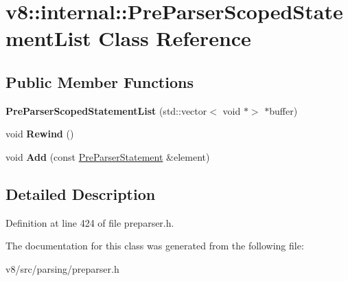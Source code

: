 \hypertarget{classv8_1_1internal_1_1PreParserScopedStatementList}{}\section{v8\+:\+:internal\+:\+:Pre\+Parser\+Scoped\+Statement\+List Class Reference}
\label{classv8_1_1internal_1_1PreParserScopedStatementList}
\subsection*{Public Member Functions}
\begin{DoxyCompactItemize}
\item 
\mbox{\label{classv8_1_1internal_1_1PreParserScopedStatementList_aec07c7d0be65465f50ce0a802b4750d4}} 
{\bfseries Pre\+Parser\+Scoped\+Statement\+List} (std\+::vector$<$ void $\ast$$>$ $\ast$buffer)
\item 
\mbox{\label{classv8_1_1internal_1_1PreParserScopedStatementList_a2aeed192792915e7d6b96ead71fffb6e}} 
void {\bfseries Rewind} ()
\item 
\mbox{\label{classv8_1_1internal_1_1PreParserScopedStatementList_a3629a7d6fce865b704093815bbed78c1}} 
void {\bfseries Add} (const \mbox{\hyperlink{classv8_1_1internal_1_1PreParserStatement}{Pre\+Parser\+Statement}} \&element)
\end{DoxyCompactItemize}


\subsection{Detailed Description}


Definition at line 424 of file preparser.\+h.



The documentation for this class was generated from the following file\+:\begin{DoxyCompactItemize}
\item 
v8/src/parsing/preparser.\+h\end{DoxyCompactItemize}

